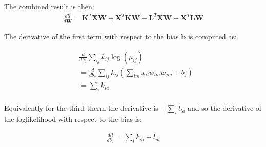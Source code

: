 \documentclass[11pt]{letter}
\newcommand{\matr}[1]{\mathbf{#1}}
\begin{document}
The combined result is then:
\begin{align*}
\frac{dll}{d\matr{W}} = \matr{K}^T \matr{X} \matr{W} + \matr{X}^T \matr{K} \matr{W} - 
\matr{L}^T \matr{X} \matr{W} - \matr{X}^T \matr{L} \matr{W}
\end{align*}


The derivative of the first term with respect to the bias $\matr{b}$ is computed as:

\begin{align*}
&\frac{d}{db_{a}}\sum_{ij} k_{ij} \log{(\mu_{ij})} \\
&= \frac{d}{db_{a}}\sum_{ij} k_{ij} (\sum_{lm} x_{il} w_{lm} w_{jm} + b_j) \\
&= \sum_{i} k_{ia}\\
\end{align*}

Equivalently for the third therm the derivative is $-\sum_{i} l_{ia}$ and so the derivative of the loglikelihood with respect to the bias is:

\begin{align*}
\frac{dll}{db_a} = \sum_{i} k_{ia} - l_{ia}\\
\end{align*}
\end{document}
